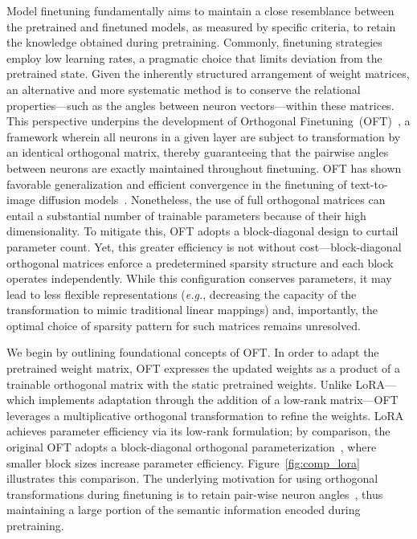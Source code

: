 Model finetuning fundamentally aims to maintain a close resemblance between the pretrained and finetuned models, as measured by specific criteria, to retain the knowledge obtained during pretraining. Commonly, finetuning strategies employ low learning rates, a pragmatic choice that limits deviation from the pretrained state. Given the inherently structured arrangement of weight matrices, an alternative and more systematic method is to conserve the relational properties—such as the angles between neuron vectors—within these matrices. This perspective underpins the development of Orthogonal Finetuning~(OFT)~\cite{qiu2023controlling}, a framework wherein all neurons in a given layer are subject to transformation by an identical orthogonal matrix, thereby guaranteeing that the pairwise angles between neurons are exactly maintained throughout finetuning. OFT has shown favorable generalization and efficient convergence in the finetuning of text-to-image diffusion models~\cite{qiu2023controlling}. Nonetheless, the use of full orthogonal matrices can entail a substantial number of trainable parameters because of their high dimensionality. To mitigate this, OFT adopts a block-diagonal design to curtail parameter count. Yet, this greater efficiency is not without cost—block-diagonal orthogonal matrices enforce a predetermined sparsity structure and each block operates independently. While this configuration conserves parameters, it may lead to less flexible representations (\emph{e.g.}, decreasing the capacity of the transformation to mimic traditional linear mappings) and, importantly, the optimal choice of sparsity pattern for such matrices remains unresolved.

We begin by outlining foundational concepts of OFT. In order to adapt the pretrained weight matrix, OFT expresses the updated weights as a product of a trainable orthogonal matrix with the static pretrained weights. Unlike LoRA—which implements adaptation through the addition of a low-rank matrix—OFT leverages a multiplicative orthogonal transformation to refine the weights. LoRA achieves parameter efficiency via its low-rank formulation; by comparison, the original OFT adopts a block-diagonal orthogonal parameterization~\cite{qiu2023controlling}, where smaller block sizes increase parameter efficiency. Figure~\ref{fig:comp_lora} illustrates this comparison. The underlying motivation for using orthogonal transformations during finetuning is to retain pair-wise neuron angles~\cite{liu2018learning,liu2021orthogonal,qiu2023controlling}, thus maintaining a large portion of the semantic information encoded during pretraining.

